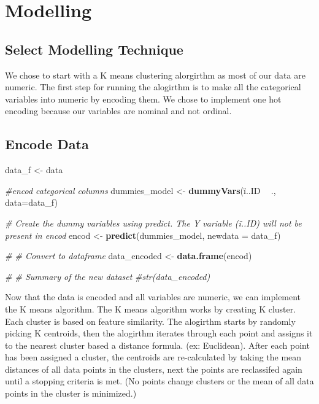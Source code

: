 \documentclass[]{article}
\newenvironment{Shaded}{\begin{snugshade}}{\end{snugshade}}
\newcommand{\KeywordTok}[1]{\textcolor[rgb]{0.13,0.29,0.53}{\textbf{#1}}}
\newcommand{\DataTypeTok}[1]{\textcolor[rgb]{0.13,0.29,0.53}{#1}}
\newcommand{\StringTok}[1]{\textcolor[rgb]{0.31,0.60,0.02}{#1}}
\newcommand{\CommentTok}[1]{\textcolor[rgb]{0.56,0.35,0.01}{\textit{#1}}}
\newcommand{\OperatorTok}[1]{\textcolor[rgb]{0.81,0.36,0.00}{\textbf{#1}}}
\newcommand{\NormalTok}[1]{#1}
\begin{document}
\section{Modelling}\label{modelling}

\subsection{Select Modelling
Technique}\label{select-modelling-technique}

We chose to start with a K means clustering alorgirthm as most of our
data are numeric. The first step for running the alogirthm is to make
all the categorical variables into numeric by encoding them. We chose to
implement one hot encoding because our variables are nominal and not
ordinal.

\subsection{Encode Data}\label{encode-data}

\begin{Shaded}
\begin{Highlighting}[]
\NormalTok{data_f <-}\StringTok{ }\NormalTok{data}

\CommentTok{#encod categorical columns}
\NormalTok{dummies_model <-}\StringTok{ }\KeywordTok{dummyVars}\NormalTok{(ï..ID }\OperatorTok{~}\StringTok{ }\NormalTok{., }\DataTypeTok{data=}\NormalTok{data_f)}

\CommentTok{# Create the dummy variables using predict. The Y variable (ï..ID) will not be present in encod}
\NormalTok{encod <-}\StringTok{ }\KeywordTok{predict}\NormalTok{(dummies_model, }\DataTypeTok{newdata =}\NormalTok{ data_f)}

\CommentTok{# # Convert to dataframe}
\NormalTok{data_encoded <-}\StringTok{ }\KeywordTok{data.frame}\NormalTok{(encod)}

\CommentTok{# # Summary of the new dataset}
\CommentTok{#str(data_encoded)}
\end{Highlighting}
\end{Shaded}

Now that the data is encoded and all variables are numeric, we can
implement the K means algorithm. The K means algorithm works by creating
K cluster. Each cluster is based on feature similarity. The alogirthm
starts by randomly picking K centroids, then the alogirthm iterates
through each point and assigns it to the nearest cluster based a
distance formula. (ex: Euclidean). After each point has been assigned a
cluster, the centroids are re-calculated by taking the mean distances of
all data points in the clusters, next the points are reclassifed again
until a stopping criteria is met. (No points change clusters or the mean
of all data points in the cluster is minimized.)
\end{document}
